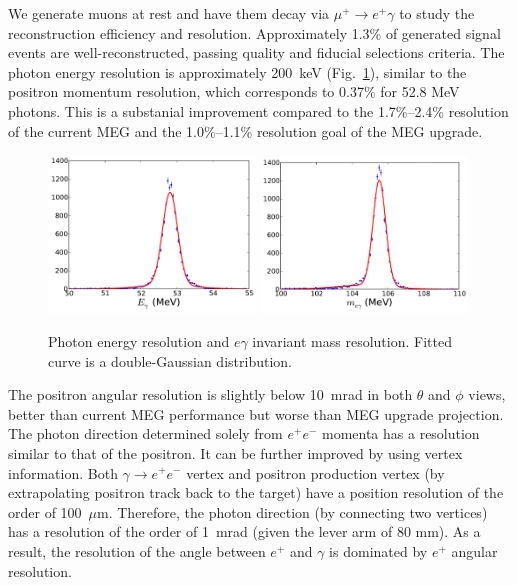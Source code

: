 We generate muons at rest and have them decay via $\mu^+\to e^+\gamma$
to study the reconstruction efficiency and resolution. 
Approximately 1.3\% of generated signal events are well-reconstructed, 
passing quality and fiducial selections criteria. The photon energy resolution 
is approximately 200~keV (Fig.~\ref{fig:eresol}), similar to the positron momentum
resolution, which 
corresponds to 0.37\% for 52.8 MeV photons. This is a substanial improvement compared 
to the 1.7\%--2.4\% resolution of the current MEG and the 1.0\%--1.1\% resolution 
goal of the MEG upgrade. 

\begin{figure}[ht]
\centering
\includegraphics[width=0.49\textwidth]{Figures/egamma-resol-fit2b.pdf}
\includegraphics[width=0.49\textwidth]{Figures/mumass-resol-fit2b.pdf}
\caption{\label{fig:eresol} Photon energy resolution and $e\gamma$ invariant
mass resolution. Fitted curve is a double-Gaussian distribution.}
\end{figure}


The positron angular resolution is slightly below 10~mrad in both $\theta$ 
and $\phi$ views,
better than current MEG performance but worse than MEG upgrade projection.
The photon direction determined solely from $e^+e^-$ momenta has a resolution
similar to that of the positron. It can be further improved  by using
vertex information. Both $\gamma\to e^+e^-$ vertex and positron production vertex
(by extrapolating positron track back to the target) have a position resolution
of the order of 100~$\mu$m. Therefore, the photon direction (by connecting two
vertices) has a resolution of the order of 1~mrad (given the lever arm of 80 mm).
As a result, the resolution of the angle between $e^+$ and $\gamma$ is dominated
by $e^+$ angular resolution.

